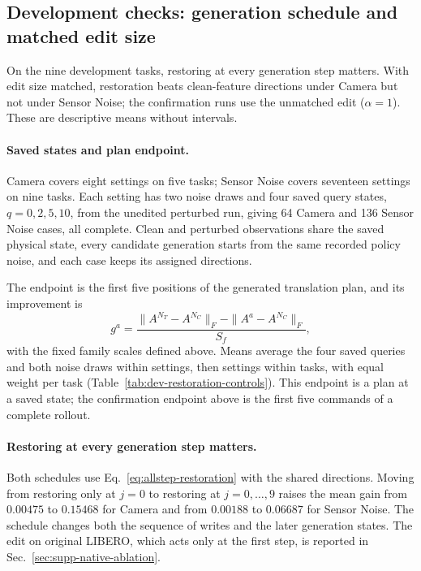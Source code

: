 

\subsection{Development checks: generation schedule and matched edit size}
\label{sec:dev-restoration-controls}

On the nine development tasks, restoring at every generation step matters. With edit size matched, restoration beats clean-feature directions under Camera but not under Sensor Noise; the confirmation runs use the unmatched edit ($\alpha=1$). These are descriptive means without intervals.

\paragraph{Saved states and plan endpoint.}
Camera covers eight settings on five tasks; Sensor Noise covers seventeen settings on nine tasks. Each setting has two noise draws and four saved query states, $q=0,2,5,10$, from the unedited perturbed run, giving 64 Camera and 136 Sensor Noise cases, all complete. Clean and perturbed observations share the saved physical state, every candidate generation starts from the same recorded policy noise, and each case keeps its assigned directions.

The endpoint is the first five positions of the generated translation plan, and its improvement is
\begin{equation}
 g^a=\frac{\|A^{N_T}-A^{N_C}\|_F-\|A^a-A^{N_C}\|_F}{S_f},
 \label{eq:dev-plan-gain}
\end{equation}
with the fixed family scales defined above. Means average the four saved queries and both noise draws within settings, then settings within tasks, with equal weight per task (Table~\ref{tab:dev-restoration-controls}). This endpoint is a plan at a saved state; the confirmation endpoint above is the first five commands of a complete rollout.



\paragraph{Restoring at every generation step matters.}
Both schedules use Eq.~\eqref{eq:allstep-restoration} with the shared directions. Moving from restoring only at $j=0$ to restoring at $j=0,\ldots,9$ raises the mean gain from $0.00475$ to $0.15468$ for Camera and from $0.00188$ to $0.06687$ for Sensor Noise. The schedule changes both the sequence of writes and the later generation states. The edit on original LIBERO, which acts only at the first step, is reported in Sec.~\ref{sec:supp-native-ablation}.


